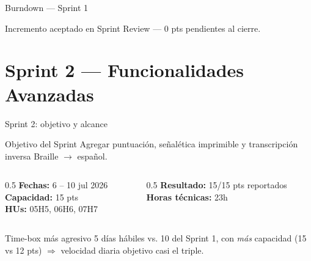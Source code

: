 \documentclass[11pt,aspectratio=169]{beamer}
\begin{document}
\begin{frame}{Burndown --- Sprint 1}
  \begin{center}
  \end{center}
  \centering\small Incremento aceptado en Sprint Review --- 0 pts pendientes al cierre.
\end{frame}

\section{Sprint 2 --- Funcionalidades Avanzadas}

\begin{frame}{Sprint 2: objetivo y alcance}
  \begin{block}{Objetivo del Sprint}
    Agregar puntuación, señalética imprimible y transcripción inversa Braille $\rightarrow$ español.
  \end{block}
  \begin{columns}[T]
    \begin{column}{0.5\textwidth}
      \textbf{Fechas:} 6 -- 10 jul 2026\\
      \textbf{Capacidad:} 15 pts\\
      \textbf{HUs:} 05H5, 06H6, 07H7
    \end{column}
    \begin{column}{0.5\textwidth}
      \textbf{Resultado:} 15/15 pts reportados\\
      \textbf{Horas técnicas:} 23h
    \end{column}
  \end{columns}
  \begin{alertblock}{Time-box más agresivo}
    5 días hábiles vs. 10 del Sprint 1, con \emph{más} capacidad (15 vs 12 pts) $\Rightarrow$ velocidad
    diaria objetivo casi el triple.
  \end{alertblock}
\end{frame}
\end{document}
